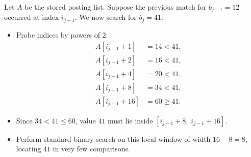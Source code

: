 \begin{example}
Let $A$ be the stored posting list. Suppose the previous match for $b_{j-1} = 12$ occurred at index $i_{j-1}$. We now search for $b_j = 41$:
\begin{itemize}
  \item Probe indices by powers of 2:
  \begin{align*}
    A[i_{j-1} + 1] &= 14 < 41, \\
    A[i_{j-1} + 2] &= 16 < 41, \\
    A[i_{j-1} + 4] &= 20 < 41, \\
    A[i_{j-1} + 8] &= 34 < 41, \\
    A[i_{j-1} + 16] &= 60 \ge 41.
  \end{align*}
  \item Since $34 < 41 \le 60$, value $41$ must lie inside $[i_{j-1} + 8, \; i_{j-1} + 16]$.
  \item Perform standard binary search on this local window of width $16 - 8 = 8$, locating $41$ in very few comparisons.
\end{itemize}
\end{example}

